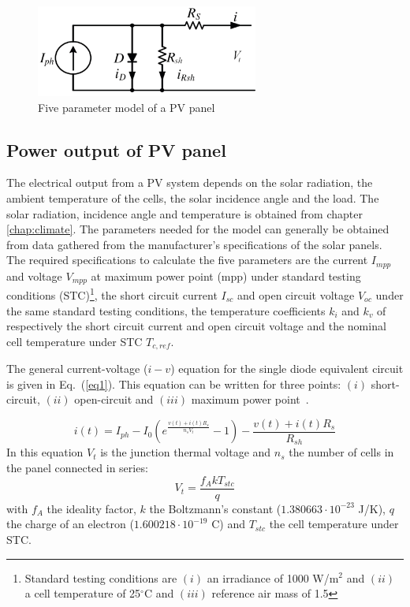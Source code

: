 \begin{figure}[ht]
\centerline{\includegraphics[width=0.65\textwidth]{Electric/MyGraphics/5param_eq.png}}
\label{fig:5param_equiv}
\caption{Five parameter model of a PV panel~\cite{desoto}} 
\end{figure}

\subsection{Power output of PV panel}
The electrical output from a PV system depends on the solar radiation, the ambient temperature of the cells, the solar incidence angle and the load. The solar radiation, incidence angle and temperature is obtained from chapter \ref{chap:climate}. The parameters needed for the model can generally be obtained from data gathered from the manufacturer's specifications of the solar panels. The required specifications to calculate the five parameters are the current $I_{mpp}$ and voltage $V_{mpp}$ at maximum power point (mpp) under standard testing conditions (STC)\footnote{Standard testing conditions are $(i)$ an irradiance of 1000 W/m$^2$ and $(ii)$ a cell temperature of 25$^\circ$C and $(iii)$ reference air mass of 1.5}, the short circuit current $I_{sc}$ and open circuit voltage $V_{oc}$ under the same standard testing conditions, the temperature coefficients $k_{i}$ and $k_{v}$ of respectively the short circuit current and open circuit voltage and the nominal cell temperature under STC $T_{c,ref}$.

The general current-voltage ($i-v$) equation for the single diode equivalent circuit is given in Eq.~(\ref{eq1}). This equation can be written for three points: $(i)$ short-circuit, $(ii)$ open-circuit and $(iii)$ maximum power point~\cite{sera}.

\begin{equation}
i(t) = I_{ph} - I_{0} \left(e^{\frac{v(t) + i(t)R_{s}}{n_{s} V_{t}}} - 1 \right) - \frac{v(t) + i(t)R_{s}}{R_{sh}}
\label{eq1}
\end{equation}
In this equation $V_{t}$ is the junction thermal voltage and $n_{s}$ the number of cells in the panel connected in series:
\begin{equation}
V_t = \frac{f_{A} k T_{stc}}{q}
\label{eqVt}
\end{equation}
with $f_A$ the ideality factor, $k$ the Boltzmann's constant ($1.380663 \cdot 10^{-23}$ J/K), $q$ the charge of an electron ($1.600218 \cdot 10^{-19}$ C) and $T_{stc}$ the cell temperature under STC.

